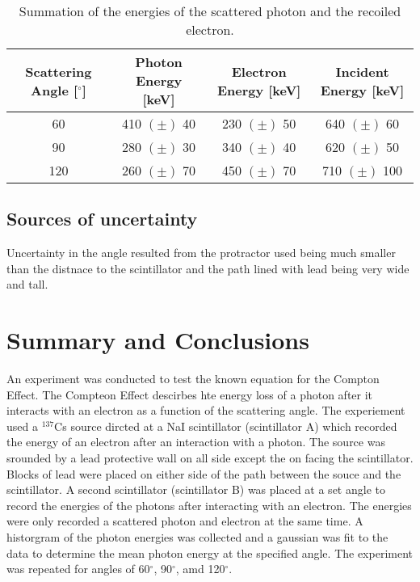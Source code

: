 \documentclass[prb,preprint,groupaddress,showpacs,superbib,floats]{revtex4-1}
\begin{document}
\begin{table}[h]
	\begin{ruledtabular}
		\begin{tabular}{cccc}
			
			\textbf{Scattering Angle [$^{\circ}$]} & \textbf{Photon Energy [keV]} & \textbf{Electron Energy [keV]} & \textbf{Incident Energy [keV]}  \\ 
			\hline
			60 & 410 $(\pm)$ 40 &  230 $(\pm)$ 50 & 640 $(\pm)$ 60   \\ 
			90 & 280 $(\pm)$ 30 & 340 $(\pm)$ 40  & 620 $(\pm)$ 50   \\ 
			120 & 260 $(\pm)$ 70  & 450 $(\pm)$ 70  & 710 $(\pm)$ 100  \\ 
			
		\end{tabular}
	\end{ruledtabular}
	\caption{ Summation of the energies of the scattered photon and the recoiled electron.}
	\label{added}
\end{table}


\subsection*{Sources of uncertainty}
Uncertainty in the angle resulted from the protractor used being much smaller than the distnace to the scintillator and the path lined with lead being very wide and tall. 

\section{Summary and Conclusions}

An experiment was conducted to test the known equation for the Compton Effect. The Compteon Effect descirbes hte energy loss of a photon after it interacts with an electron as a function of the scattering angle. The experiement used a $^{137}$Cs source dircted at a NaI scintillator (scintillator A) which recorded the energy of an electron after an interaction with a photon. The source was srounded by a lead protective wall on all side except the on facing the scintillator. Blocks of lead were placed on either side of the path between the souce and the scintillator. A second scintillator (scintillator B) was placed at a set angle to record the energies of the photons after interacting with an electron. The energies were only recorded a scattered photon and electron at the same time. A historgram of the photon energies was collected and a gaussian was fit to the data to determine the mean photon energy at the specified angle. The experiment was repeated for angles of 60$^{\circ}$, 90$^{\circ}$, amd 120$^{\circ}$. 
\end{document}
